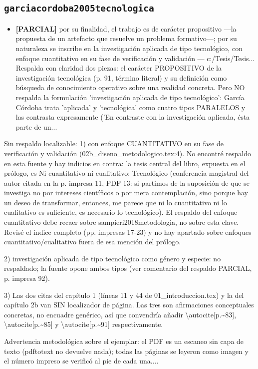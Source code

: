\documentclass[11pt,a4paper]{article}
\newcommand{\campo}[1]{\textcolor{gris}{\footnotesize #1}}
\begin{document}
\subsection{\texttt{garciacordoba2005tecnologica}}
\begin{itemize}\small
\item \textbf{[PARCIAL]} \textquotedbl{}por su finalidad, el trabajo es de carácter propositivo ---la propuesta de un artefacto que resuelve un problema formativo---; por su naturaleza se inscribe en la investigación aplicada de tipo tecnológico, con enfoque cuantitativo en su fase de verificación y validación\textquotedbl{} --- c:/Tesis/Tesis...
\\ \campo{Respalda con claridad dos piezas: el carácter PROPOSITIVO de la investigación tecnológica (p. 91, término literal) y su definición como búsqueda de conocimiento operativo sobre una realidad concreta. Pero NO respalda la formulación 'investigación aplicada de tipo tecnológico': García Córdoba trata 'aplicada' y 'tecnológica' como cuatro tipos PARALELOS y las contrasta expresamente ('En contraste con la investigación aplicada, ésta parte de un...}
\end{itemize}
{\small\campo{Sin respaldo localizable:} 1) \textquotedbl{}con enfoque CUANTITATIVO en su fase de verificación y validación\textquotedbl{} (02b\_diseno\_metodologico.tex:4). No encontré respaldo en esta fuente y hay indicios en contra: la tesis central del libro, expuesta en el prólogo, es \textquotedbl{}Ni cuantitativo ni cualitativo: Tecnológico\textquotedbl{} (conferencia magistral del autor citada en la p. impresa 11, PDF 13: \textquotedbl{}si partimos de la suposición de que se investiga no por intereses científicos o por mera contemplación, sino porque hay un deseo de transformar, entonces, me parece que ni lo cuantitativo ni lo cualitativo es suficiente, es necesario lo tecnológico\textquotedbl{}). El respaldo del enfoque cuantitativo debe recaer sobre sampieri2018metodologia, no sobre esta clave. Revisé el índice completo (pp. impresas 17-23) y no hay apartado sobre enfoques cuantitativo/cualitativo fuera de esa mención del prólogo.

2) \textquotedbl{}investigación aplicada de tipo tecnológico\textquotedbl{} como género y especie: no respaldado; la fuente opone ambos tipos (ver comentario del respaldo PARCIAL, p. impresa 92).

3) Las dos citas del capítulo 1 (líneas 11 y 44 de 01\_introduccion.tex) y la del capítulo 2b van SIN localizador de página. Las tres son afirmaciones conceptuales concretas, no encuadre genérico, así que convendría añadir \textbackslash{}autocite[p.\textasciitilde{}83], \textbackslash{}autocite[p.\textasciitilde{}85] y \textbackslash{}autocite[p.\textasciitilde{}91] respectivamente.

Advertencia metodológica sobre el ejemplar: el PDF es un escaneo sin capa de texto (pdftotext no devuelve nada); todas las páginas se leyeron como imagen y el número impreso se verificó al pie de cada una....\par}
\end{document}
